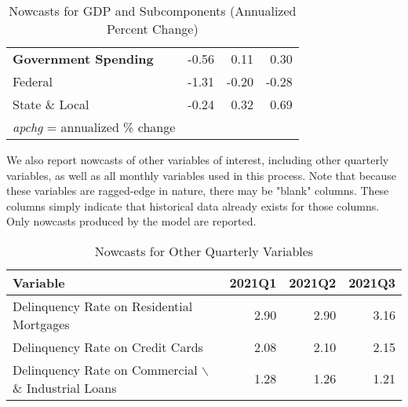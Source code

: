 \documentclass[11pt, letterpaper]{article}\usepackage[]{graphicx}\usepackage[]{color}
\begin{document}
\begin{table}[H]
\begin{tabular}{lrrr}
  \hspace{0mm} \textbf{Government Spending} & -0.56 & 0.11 & 0.30 \\ 
  \hspace{8mm}  Federal & -1.31 & -0.20 & -0.28 \\ 
  \hspace{8mm}  State \& Local & -0.24 & 0.32 & 0.69 \\ 
   \hline 
 \textit{apchg} = annualized \% change 
\end{tabular}
\endgroup
\caption{Nowcasts for GDP and Subcomponents (Annualized Percent Change)} 
\end{table}


We also report nowcasts of other variables of interest, including other quarterly variables, as well as all monthly variables used in this process. Note that because these variables are ragged-edge in nature, there may be "blank" columns. These columns simply indicate that historical data already exists for those columns. Only nowcasts produced by the model are reported.
\begin{table}[H]
\centering
\begingroup\fontsize{11pt}{13pt}\selectfont
\begin{tabular}{lrrr}
  \hline
Variable & 2021Q1 & 2021Q2 & 2021Q3 \\ 
  \hline
Delinquency Rate on Residential Mortgages & 2.90 & 2.90 & 3.16 \\ 
  Delinquency Rate on Credit Cards & 2.08 & 2.10 & 2.15 \\ 
  Delinquency Rate on Commercial $\backslash$\& Industrial Loans & 1.28 & 1.26 & 1.21 \\ 
   \hline
\end{tabular}
\endgroup
\caption{Nowcasts for Other Quarterly Variables} 
\end{table}
\end{document}
